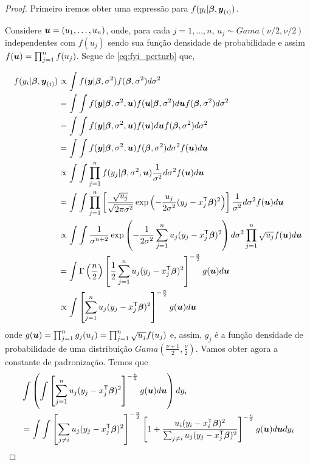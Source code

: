 \begin{proof}
Primeiro iremos obter uma expressão para $f(y_i|{\boldsymbol{\beta}},{\boldsymbol{y}_{(i)}})$.

Considere ${\boldsymbol{u}}=(u_1,\ldots,u_n)$, onde, para cada $j=1,\dots,n$, $u_j\sim Gama(\nu/2,\nu/2)$ independentes com $f(u_j)$ sendo sua função densidade de probabilidade e assim $f({\boldsymbol{u}})=\prod_{j=1}^nf(u_j)$. Segue de \eqref{eq:fyi_perturb} que,

\begin{align*}
f(y_i|{\boldsymbol{\beta}},{\boldsymbol{y}_{(i)}}) & \propto \int f({\boldsymbol{y}}|{\boldsymbol{\beta}},\sigma^2)f({\boldsymbol{\beta}},\sigma^2) d\sigma^2 \\
{} & = \int \int f({\boldsymbol{y}}|{\boldsymbol{\beta}},\sigma^2,{\boldsymbol{u}}) f({\boldsymbol{u}}|{\boldsymbol{\beta}},\sigma^2) d{\boldsymbol{u}} f({\boldsymbol{\beta}},\sigma^2) d\sigma^2  \\
{} & = \int \int f({\boldsymbol{y}}|{\boldsymbol{\beta}},\sigma^2,{\boldsymbol{u}}) f({\boldsymbol{u}}) d{\boldsymbol{u}} f({\boldsymbol{\beta}},\sigma^2) d\sigma^2 \\
{} & = \int \int f({\boldsymbol{y}}|{\boldsymbol{\beta}},\sigma^2,{\boldsymbol{u}})  f({\boldsymbol{\beta}},\sigma^2) d\sigma^2 f({\boldsymbol{u}}) d{\boldsymbol{u}} \\
{} & \propto \int \int \prod_{j=1}^n f(y_j|{\boldsymbol{\beta}},\sigma^2,{\boldsymbol{u}})  \frac{1}{\sigma^2}d\sigma^2 f({\boldsymbol{u}}) d{\boldsymbol{u}} \\
{} & =\int \int \prod_{j=1}^n \left[\frac{\sqrt{u_j}}{\sqrt{2\pi\sigma^2}}\exp\left(-\frac{u_j}{2\sigma^2}(y_j - x_j^{\mathsf{T}}{\boldsymbol{\beta}})^2\right) \right]  \frac{1}{\sigma^2}d\sigma^2 f({\boldsymbol{u}}) d{\boldsymbol{u}} \\
{} & \propto \int \int \frac{1}{\sigma^{n+2}} \exp\left(-\frac{1}{2\sigma^2}\sum_{j=1}^nu_j(y_j - x_j^{\mathsf{T}}{\boldsymbol{\beta}})^2\right)d\sigma^2 \prod_{j=1}^n \sqrt{u_j} f({\boldsymbol{u}}) d{\boldsymbol{u}} \\
{} & = \int \Gamma\left(\frac{n}{2}\right) \left[\frac{1}{2}\sum_{j=1}^n u_j(y_j - x_j^{\mathsf{T}}{\boldsymbol{\beta}})^2\right]^{-\frac{n}{2}} g({\boldsymbol{u}}) d {\boldsymbol{u}} \\
{} & \propto \int \left[\sum_{j=1}^nu_j(y_j-x_j^{\mathsf{T}}{\boldsymbol{\beta}})^2\right]^{-\frac{n}{2}} g({\boldsymbol{u}}) d{\boldsymbol{u}}
\end{align*}
onde $g({\boldsymbol{u}})=\prod_{j=1}^n g_j(u_j)=\prod_{j=1}^n \sqrt{u_j} f(u_j)$ e, assim, $g_j$ é a função densidade de probabilidade de uma distribuição $Gama(\frac{\nu+1}{2},\frac{\nu}{2})$. Vamos obter agora a constante de padronização. Temos que
\begin{equation*}
\begin{split}
& \int \left( \int \left[\sum_{j=1}^nu_j(y_j-x_j^\transp\betabf)^2\right]^{-\frac{n}{2}} g(\ubf) d\ubf \right) d y_i \\
& = \int \int \left[\sum_{j\neq i}u_j(y_j-x_j^\transp\betabf)^2\right]^{-\frac{n}{2}} \left[1+\frac{u_i(y_i-x_i^\transp\betabf)^2}{\sum_{j\neq i}u_j(y_j-x_j^\transp\betabf)^2}\right]^{-\frac{n}{2}} g(\ubf) d\ubf d y_i \\

\end{split}
\end{equation*}
\end{proof}
